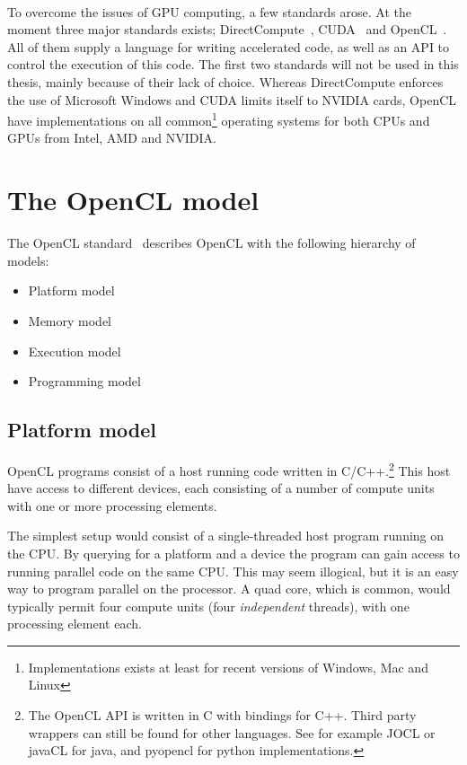 \paragraph*{}
To overcome the issues of GPU computing, a few standards arose.
At the moment three major standards exists; DirectCompute~\cite{directcompute}, CUDA~\cite{cuda} and OpenCL~\cite{openclspec}.
All of them supply a language for writing accelerated code, as well as an API to control the execution of this code.
The first two standards will not be used in this thesis, mainly because of their lack of choice.
Whereas DirectCompute enforces the use of Microsoft Windows and CUDA limits itself to NVIDIA cards, OpenCL have implementations on all common\footnote{Implementations exists at least for recent versions of Windows, Mac and Linux} operating systems for both CPUs and GPUs from Intel, AMD and NVIDIA.



\section{The OpenCL model}
The OpenCL standard~\cite{openclspec} describes OpenCL with the following hierarchy of models:
\begin{itemize}
\item Platform model
\item Memory model
\item Execution model
\item Programming model
\end{itemize}


\subsection{Platform model}
OpenCL programs consist of a host running code written in C/C++.\footnote{The OpenCL API is written in C with bindings for C++. Third party wrappers can still be found for other languages. See for example JOCL or javaCL for java, and pyopencl for python implementations.}
This host have access to different devices, each consisting of a number of compute units with one or more processing elements. 

The simplest setup would consist of a single-threaded host program running on the CPU. 
By querying for a platform and a device the program can gain access to running parallel code on the same CPU. 
This may seem illogical, but it is an easy way to program parallel on the processor.
A quad core, which is common, would typically permit four compute units (four \textit{independent} threads), with one processing element each.

